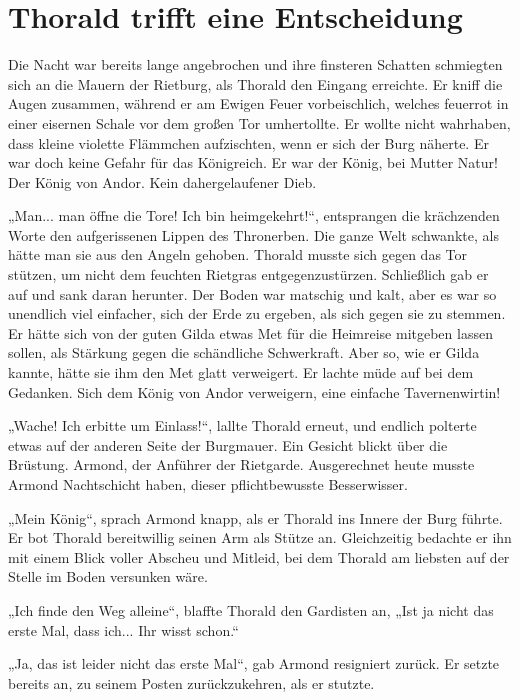 \newpage
\section{Thorald trifft eine Entscheidung}


Die Nacht war bereits lange angebrochen und ihre finsteren Schatten schmiegten sich an die Mauern der Rietburg, als Thorald den Eingang erreichte. Er kniff die Augen zusammen, während er am Ewigen Feuer vorbeischlich, welches feuerrot in einer eisernen Schale vor dem großen Tor umhertollte. Er wollte nicht wahrhaben, dass kleine violette Flämmchen aufzischten, wenn er sich der Burg näherte. Er war doch keine Gefahr für das Königreich. Er war der König, bei Mutter Natur! Der König von Andor. Kein dahergelaufener Dieb.

„Man... man öffne die Tore! Ich bin heimgekehrt!“, entsprangen die krächzenden Worte den aufgerissenen Lippen des Thronerben. Die ganze Welt schwankte, als hätte man sie aus den Angeln gehoben. Thorald musste sich gegen das Tor stützen, um nicht dem feuchten Rietgras entgegenzustürzen. Schließlich gab er auf und sank daran herunter. Der Boden war matschig und kalt, aber es war so unendlich viel einfacher, sich der Erde zu ergeben, als sich gegen sie zu stemmen. Er hätte sich von der guten Gilda etwas Met für die Heimreise mitgeben lassen sollen, als Stärkung gegen die schändliche Schwerkraft. Aber so, wie er Gilda kannte, hätte sie ihm den Met glatt verweigert. Er lachte müde auf bei dem Gedanken. Sich dem König von Andor verweigern, eine einfache Tavernenwirtin!

„Wache! Ich erbitte um Einlass!“, lallte Thorald erneut, und endlich polterte etwas auf der anderen Seite der Burgmauer. Ein Gesicht blickt über die Brüstung. Armond, der Anführer der Rietgarde. Ausgerechnet heute musste Armond Nachtschicht haben, dieser pflichtbewusste Besserwisser.

„Mein König“, sprach Armond knapp, als er Thorald ins Innere der Burg führte. Er bot Thorald bereitwillig seinen Arm als Stütze an. Gleichzeitig bedachte er ihn mit einem Blick voller Abscheu und Mitleid, bei dem Thorald am liebsten auf der Stelle im Boden versunken wäre.

„Ich finde den Weg alleine“, blaffte Thorald den Gardisten an, „Ist ja nicht das erste Mal, dass ich... Ihr wisst schon.“

„Ja, das ist leider nicht das erste Mal“, gab Armond resigniert zurück. Er setzte bereits an, zu seinem Posten zurückzukehren, als er stutzte.

